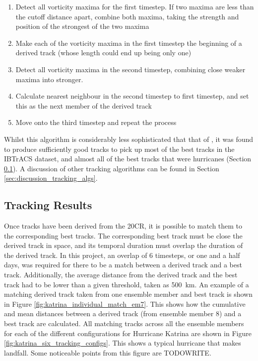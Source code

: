 \documentclass[pdftex,12pt,a4paper]{report}
\begin{document}
\begin{enumerate}
    \item Detect all vorticity maxima for the first timestep. If two maxima are less than the cutoff
        distance apart, combine both maxima, taking the strength and position of the strongest of
        the two maxima
    \item Make each of the vorticity maxima in the first timestep the beginning of a derived track
        (whose length could end up being only one)
    \item Detect all vorticity maxima in the second timestep, combining close weaker maxima into
        stronger. %
    \item Calculate nearest neighbour in the second timestep to first timestep, and set this as the
        next member of the derived track
    \item Move onto the third timestep and repeat the process
\end{enumerate}

Whilst this algorithm is considerably less sophisticated that that of \textcite{hodges1994}, it was
found to produce sufficiently good tracks to pick up most of the best tracks in the IBTrACS dataset,
and almost all of the best tracks that were hurricanes (Section  \ref{sec:results_tracking}). A
discussion of other tracking algorithms can be found in Section \ref{sec:discussion_tracking_algs}.

\subsection{Tracking Results}
\label{sec:results_tracking}

Once tracks have been derived from the 20CR, it is possible to match them to the corresponding best
tracks. The corresponding best track must be close the derived track in space, and its temporal
duration must overlap the duration of the derived track. In this project, an overlap of 6 timesteps,
or one and a half days, was required for there to be a match between a derived track and a best
track. Additionally, the average distance from the derived track and the best track had to be lower
than a given threshold, taken as \SI{500}{km}. An example of a matching derived track taken from
one ensemble member and best track is shown in Figure \ref{fig:katrina_individual_match_em7}.
This shows how the cumulative and mean distances between a derived track (from ensemble member 8)
and a best track are calculated. All matching tracks across all the ensemble members for each of the
different configurations for Hurricane Katrina are shown in Figure
\ref{fig:katrina_six_tracking_configs}. This shows a typical hurricane that makes landfall. Some
noticeable points from this figure are TODOWRITE.
\end{document}
